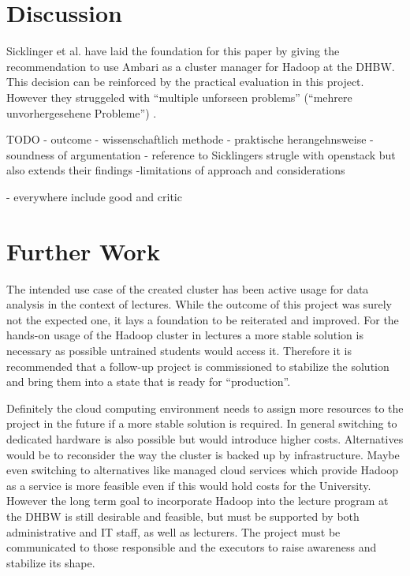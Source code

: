 \section{Discussion}

Sicklinger et al. have laid the foundation for this paper by giving the 
recommendation to use Ambari as a cluster manager for Hadoop at the \ac{DHBW}.
This decision can be reinforced by the practical evaluation in this project.
However they struggeled with \enquote{multiple unforseen problems} (\enquote{mehrere unvorhergesehene
Probleme}) \autocite[][p. 53]{wi2018managementsystems}.

TODO
- outcome
- wissenschaftlich methode
- praktische herangehnsweise
- soundness of argumentation
- reference to Sicklingers strugle with openstack but also extends their findings
-limitations of approach and considerations

- everywhere include good and critic


\section{Further Work}

The intended use case of the created cluster has been active usage for data analysis in the context of lectures.
While the outcome of this project was surely not the expected one, 
it lays a foundation to be reiterated and improved.
For the hands-on usage of the Hadoop cluster in lectures a more stable 
solution is necessary as possible untrained students would access it.
Therefore it is recommended that a follow-up project is commissioned to stabilize the solution and bring them into a state that is ready for \enquote{production}.

Definitely the cloud computing environment needs to assign more resources to the project in the future if a more stable solution is required.
In general switching to dedicated hardware is also possible but would introduce higher costs.
Alternatives would be to reconsider the way the cluster is backed up by infrastructure.
Maybe even switching to alternatives like managed cloud services which provide Hadoop as a service is more feasible even if this would hold costs for the University.
However the long term goal to incorporate Hadoop into the lecture program at the \ac{DHBW} is still desirable and feasible, but must be supported by both administrative and \ac{IT} staff, as well as lecturers. 
The project must be communicated to those responsible and the executors to raise awareness and stabilize its shape.



